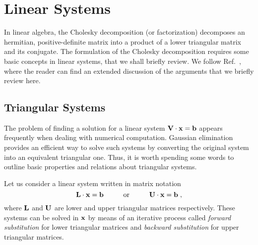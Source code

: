 \chapter{Linear Systems}
\label{app:lin_sys}

In linear algebra, the Cholesky decomposition (or factorization) decomposes an hermitian, positive-definite matrix into a product of a lower triangular matrix and its conjugate. The formulation of the Cholesky decomposition requires some basic concepts in linear systems, that we shall briefly review. We follow Ref.~\cite{GoluVanl96}, where the reader can find an extended discussion of the arguments that we briefly review here.

\section{Triangular Systems}
The problem of finding a solution for a linear system $\mathbf{V} \cdot \mathbf{x} = \mathbf{b}$ appears frequently when dealing with numerical computation. Gaussian elimination provides an efficient way to solve such systems by converting the  original system into an equivalent triangular one. Thus, it is worth spending some words to outline basic properties and relations about triangular systems.%

Let us consider a linear system written in matrix notation
\begin{equation}
    \mb{L} \cdot \mb{x} = \mb{b} \hspace{10mm} \textrm{or} \hspace{10mm} \mb{U} \cdot \mb{x} = \mb{b} \; ,
\end{equation}
where $\mathbf{L}$ and $\mathbf{U}$ are lower and upper triangular matrices respectively. These systems can be solved in $\mathbf{x}$ by means of an iterative process called \textit{forward substitution} for lower triangular matrices and \textit{backward substitution} for upper triangular matrices. 


